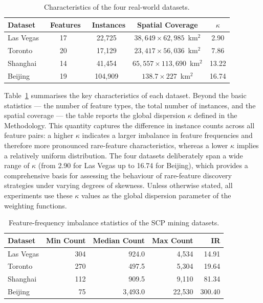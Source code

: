 \documentclass[12pt, letterpaper]{template}
\theoremstyle{definition}
\begin{document}
\begin{table}[h]
\centering
\caption{Characteristics of the four real-world datasets.}
\label{tab:dataset}
\begin{tabular}{lcccc}
\toprule
\textbf{Dataset} & \textbf{\ Features} & \textbf{\ Instances} & \textbf{Spatial Coverage} & \textbf{$\kappa$} \\
\midrule
Las Vegas & 17 & 22{,}725 & $38{,}649 \times 62{,}985$~km$^2$ & 2.90 \\
Toronto   & 20 & 17{,}129 & $23{,}417 \times 56{,}036$~km$^2$ & 7.86 \\
Shanghai  & 14 & 41{,}454 & $65{,}557 \times 113{,}690$~km$^2$ & 13.22 \\
Beijing   & 19 & 104{,}909 & $138.7 \times 227$~km$^2$ & 16.74 \\
\bottomrule
\end{tabular}
\end{table}

Table~\ref{tab:dataset} summarises the key characteristics of each dataset.
Beyond the basic statistics --- the number of feature types, the total number of
instances, and the spatial coverage --- the table reports the global dispersion
$\kappa$ defined in the Methodology. This quantity captures the difference in
instance counts across all feature pairs: a higher $\kappa$ indicates a larger
imbalance in feature frequencies and therefore more pronounced rare-feature
characteristics, whereas a lower $\kappa$ implies a relatively uniform
distribution. The four datasets deliberately span a wide range of $\kappa$
(from 2.90 for Las Vegas up to 16.74 for Beijing), which provides a comprehensive
basis for assessing the behaviour of rare-feature discovery strategies under
varying degrees of skewness. Unless otherwise stated, all experiments use these
$\kappa$ values as the global dispersion parameter of the weighting functions.

\begin{table}[h]
\centering
\caption{Feature-frequency imbalance statistics of the SCP mining datasets.}
\label{tab:imbalance_stats}
\begin{tabular}{lrrrr}
\toprule
\textbf{Dataset} 
& \textbf{Min Count} 
& \textbf{Median Count} 
& \textbf{Max Count} 
& \textbf{IR} \\
\midrule
Las Vegas & 304 & 924.0   & 4{,}534  & 14.91 \\
Toronto   & 270 & 497.5   & 5{,}304  & 19.64 \\
Shanghai  & 112 & 909.5   & 9{,}110  & 81.34 \\
Beijing   & 75  & 3{,}493.0 & 22{,}530 & 300.40 \\
\bottomrule
\end{tabular}
\end{table}
\end{document}
